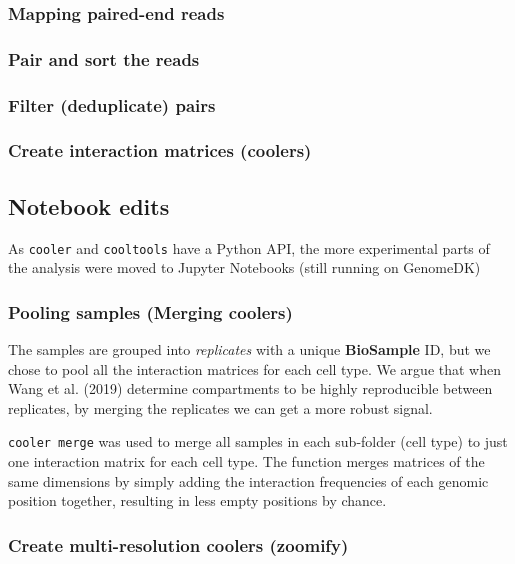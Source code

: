 \documentclass[
  a4paper,
]{scrbook}
\let\oldemph\emph
\renewcommand\emph[1]{\oldemph{\color{gray}#1}}
\begin{document}
\subsubsection{Mapping paired-end reads}\label{mapping-paired-end-reads}

\subsubsection{Pair and sort the reads}\label{pair-and-sort-the-reads}

\subsubsection{Filter (deduplicate)
pairs}\label{filter-deduplicate-pairs}

\subsubsection{Create interaction matrices
(coolers)}\label{create-interaction-matrices-coolers}

\subsection{Notebook edits}\label{notebook-edits}

As \texttt{cooler} and \texttt{cooltools} have a Python API, the more
experimental parts of the analysis were moved to Jupyter Notebooks
(still running on GenomeDK)

\subsubsection{Pooling samples (Merging
coolers)}\label{pooling-samples-merging-coolers}

The samples are grouped into \emph{replicates} with a unique
\textbf{BioSample} ID, but we chose to pool all the interaction matrices
for each cell type. We argue that when Wang et al. (2019) determine
compartments to be highly reproducible between replicates, by merging
the replicates we can get a more robust signal.

\texttt{cooler\ merge} was used to merge all samples in each sub-folder
(cell type) to just one interaction matrix for each cell type. The
function merges matrices of the same dimensions by simply adding the
interaction frequencies of each genomic position together, resulting in
less empty positions by chance.

\subsubsection{Create multi-resolution coolers
(zoomify)}\label{create-multi-resolution-coolers-zoomify}
\end{document}
